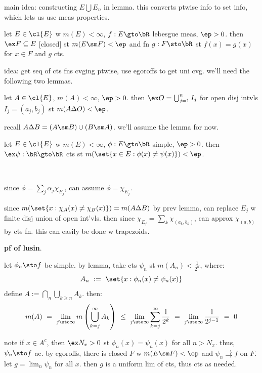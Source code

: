 main idea: constructing $E\bigcup E_{n}$ in lemma.
this converts ptwise info to set info, which lets us use meas properties.

\begin{thm}[title=Lusin]
	let $E\in\cl{E}$ w $m(E)<\infty$, $f:E\gto\bR$ lebesgue meas, $\ep>0$.
	then $\ex F\subseteq E$ [closed] st $m(E\sm F)<\ep$ and fn $g:F\sto\bR$ st
	$f(x)=g(x)$ for $x\in F$ and $g$ cts.
\end{thm}
idea: get seq of cts fns cvging ptwise, use egoroffs to get uni cvg.
we'll need the following two lemmas.

\begin{lm}
	let $A\in\cl{E}$, $m(A)<\infty$, $\ep>0$.
	then $\ex O=\bigcup_{j=1}^{n}I_{j}$ for open disj intvls $I_{j}=(a_{j},b_{j})$
	st $m(A\Delta O)<\ep$.
\end{lm}
recall $A\Delta B=(A\sm B)\cup(B\sm A)$.
we'll assume the lemma for now.

\begin{lm}
	let $E\in\cl{E}$ w $m(E)<\infty$, $\phi:E\gto\bR$ simple, $\ep>0$.
	then $\ex\psi:\bR\gto\bR$ cts st $m(\set{x\in E:\phi(x)\neq\psi(x)})<\ep$.
\end{lm} \

\begin{pf}
	since $\phi=\sum_{j}\alpha_{j}\chi_{E_{j}}$, can assume $\phi=\chi_{E_{j}}$.

	since $m(\set{x:\chi_{A}(x)\neq\chi_{B}(x)})=m(A\Delta B)$ by prev lemma,
	can replace $E_{j}$ w finite disj union of open int'vls.
	then since $\chi_{E_{j}}=\sum_{k}\chi_{(a_{k},b_{k})}$, can approx
	$\chi_{(a,b)}$ by cts fn.
	this can easily be done w trapezoids.
\end{pf}

\textbf{pf of lusin}.

let $\phi_{n}\sto f$ be simple.
by lemma, take cts $\psi_{n}$ st $m(A_{n})<\frac{1}{2^{n}}$, where:
\begin{equation*}
	A_{n} \ := \ \set{x:\phi_{n}(x)\neq\psi_{n}(x)}
\end{equation*}
define $A:=\bigcap_{n}\bigcup_{k\geq n}A_{k}$. then:
\begin{equation*}
	m(A) \ = \ \lim_{j\sto\infty}m\left(\bigcup_{k=j}^{\infty}A_{k}\right)
	\ \leq \ \lim_{j\sto\infty}\sum_{k=j}^{\infty}\frac{1}{2^{k}}
	\ = \ \lim_{j\sto\infty}\frac{1}{2^{j-1}} \ = \ 0
\end{equation*}

note if $x\in A^{c}$, then $\ex N_{x}>0$ st $\phi_{n}(x)=\psi_{n}(x)$ for all $n>N_{x}$.
thus, $\psi_{n}\sto f$ ae.
by egoroffs, there is closed $F$ w $m(E\sm F)<\ep$ and $\psi_{n}\rightrightarrows f$ on $F$.
let $g=\lim_{n}\psi_{n}$ for all $x$.
then $g$ is a uniform lim of cts, thus cts as needed.


